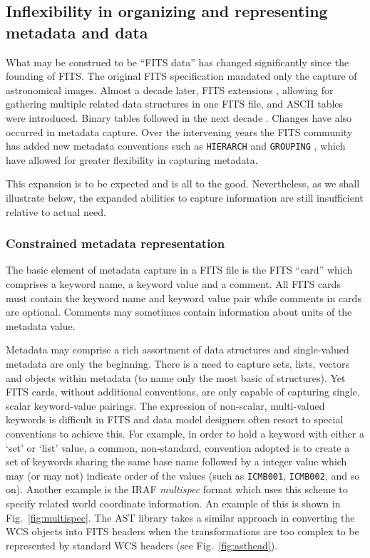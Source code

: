 \documentclass[final,authoryear,5p,times,twocolumn]{elsarticle}
\begin{document}
\subsection{Inflexibility in organizing and representing metadata and data}


What may be construed to be ``FITS data'' has changed significantly
since the founding of FITS. The original FITS specification mandated
only the capture of astronomical images. Almost a decade later, FITS
extensions \citep{1988A&AS...73..359G}, allowing for gathering
multiple related data structures in one FITS file, and ASCII tables
\citep{1988A&AS...73..365H} were introduced. Binary tables followed in
the next decade \citep{1995A&AS..113..159C}. Changes have also
occurred in metadata capture. Over the intervening years the FITS
community has added new metadata conventions such as \texttt{HIERARCH}
\citep{2009Wic} and \texttt{GROUPING} \citep{2007Jen}, which have
allowed for greater flexibility in capturing metadata.


This expansion is to be expected and is all to the good. Nevertheless,
as we shall illustrate below, the expanded abilities to capture
information are still insufficient relative to actual need.


\subsubsection{Constrained metadata representation}


The basic element of metadata capture in a FITS file is the FITS
``card'' which comprises a keyword name, a keyword value and a
comment. All FITS cards must contain the keyword name and keyword
value pair while comments in cards are optional. Comments may
sometimes contain information about units of the metadata value.


Metadata may comprise a rich assortment of data structures and
single-valued metadata are only the beginning. There is a need to
capture sets, lists, vectors and objects within metadata (to name only
the most basic of structures). Yet FITS cards, without additional
conventions, are only capable of capturing single, scalar
keyword-value pairings. The expression of non-scalar, multi-valued
keywords is difficult in FITS and data model designers often resort to
special conventions to achieve this. For example, in order to hold a
keyword with either a `set' or `list' value, a common, non-standard,
convention adopted is to create a set of keywords sharing the same
base name followed by a integer value which may (or may not) indicate
order of the values (such as \texttt{ICMB001}, \texttt{ICMB002}, and
so on). Another example is the IRAF \textit{multispec} format
\citep[see][and references therein]{1993ASPC...52..467V} which uses
this scheme to specify related world coordinate information. An
example of this is shown in Fig.\ \ref{fig:multispec}. The AST library
\citep[][and see also \S\ref{sec:wcs}]{1998ASPC..145...41W} takes a
similar approach in converting the WCS objects into FITS headers when
the transformations are too complex to be represented by standard WCS
headers (see Fig.\ \ref{fig:asthead}).
\end{document}

